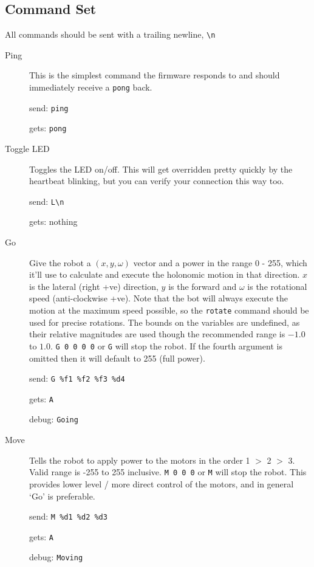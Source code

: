 \subsection{Command Set}

All commands should be sent with a trailing newline, \verb|\n|

\begin{description}

\item[Ping]
  This is the simplest command the firmware responds to and should immediately receive a \verb|pong| back.

  send: \verb|ping|
  
  gets: \verb|pong|
  

\item[Toggle LED]
  Toggles the LED on/off. This will get overridden pretty quickly by the heartbeat blinking, but you can verify your connection this way too.

  send: \verb|L\n|
  
  gets: nothing

\item[Go] 
  Give the robot a $(x,y,\omega)$ vector and a power in the range 0 - 255, which it'll use to calculate and execute the holonomic motion in that direction. $x$ is the lateral (right +ve) direction, $y$ is the forward and $\omega$ is the rotational speed (anti-clockwise +ve). Note that the bot will always execute the motion at the maximum speed possible, so the \verb|rotate| command should be used for precise rotations. The bounds on the variables are undefined, as their relative magnitudes are used though the recommended range is $-1.0$ to $1.0$. \verb|G 0 0 0 0| or \verb|G| will stop the robot. If the fourth argument is omitted then it will default to 255 (full power).

  send: \verb|G %f1 %f2 %f3 %d4|

  gets: \verb|A|

  debug: \verb|Going|
  
\item[Move] 
  Tells the robot to apply power to the motors in the order 1 $>$ 2 $>$ 3. Valid range is -255 to 255 inclusive. \verb|M 0 0 0| or \verb|M| will stop the robot. This provides lower level / more direct control of the motors, and in general `Go' is preferable.

  send: \verb|M %d1 %d2 %d3|
  
  gets: \verb|A|

  debug: \verb|Moving|


\end{description}
